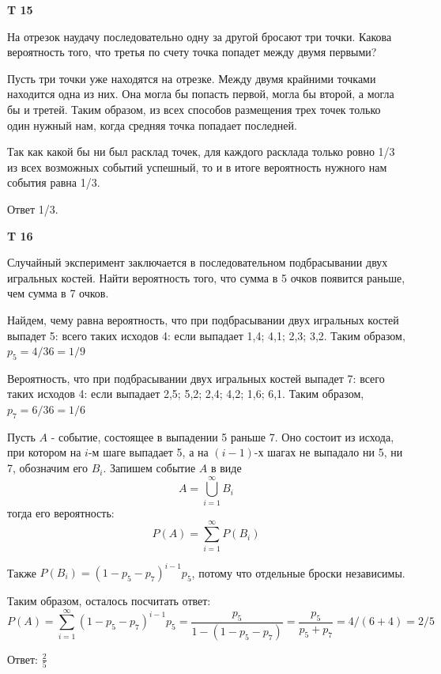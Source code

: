 \documentclass[a4paper,12pt]{article} %
\begin{document}
\begin{example}\textbf{T 15}

На отрезок наудачу последовательно одну за другой бросают три точки. 
Какова вероятность того, что третья по счету точка попадет между двумя первыми?


Пусть три точки уже находятся на отрезке.
Между двумя крайними точками находится одна из них. Она могла бы попасть первой, могла бы второй, а могла бы и третей. 
Таким образом, из всех способов размещения трех точек только один нужный нам, когда средняя точка попадает последней.

Так как какой бы ни был расклад точек, для каждого расклада только ровно 1/3 из всех возможных событий успешный, то и в итоге вероятность нужного нам события равна 1/3.

Ответ 1/3.

\end{example}





\begin{example}\textbf{T 16}

Случайный эксперимент заключается в последовательном подбрасывании двух игральных костей. 
Найти вероятность того, что сумма в 5 очков появится раньше, чем сумма в 7 очков.

Найдем, чему равна вероятность, что при подбрасывании двух игральных костей выпадет 5: 
всего таких исходов 4: если выпадает 1,4; 4,1; 2,3; 3,2. Таким образом, $ p_5=4/36=1/9 $

Вероятность, что при подбрасывании двух игральных костей выпадет 7: 
всего таких исходов 4: если выпадает 2,5; 5,2; 2,4; 4,2; 1,6; 6,1. Таким образом, $ p_7=6/36=1/6 $


Пусть $A$ - событие, состоящее в выпадении 5 раньше 7. 
Оно состоит из исхода, при котором на $ i$-м шаге выпадает 5, а на $(i-1)$-х шагах не выпадало ни 5, ни 7, обозначим его $ B_i $. Запишем событие $ A$ в виде
\[ A=\bigcup_{i=1}^{\infty}B_i \]
тогда его вероятность:
\[ P(A)=\sum_{i=1}^{\infty} P(B_i) \]

Также $ P(B_i)=(1-p_5-p_7)^{i-1}p_5$, потому что отдельные броски независимы.

Таким образом, осталось посчитать ответ:
\[ P(A)=\sum_{i=1}^{\infty} (1-p_5-p_7)^{i-1}p_5=\frac{p_5}{1-(1-p_5-p_7)}=\frac{p_5}{p_5+p_7}=4/(6+4)=2/5 \]

Ответ: $ \frac{2}{5} $

\end{example}
\end{document}
